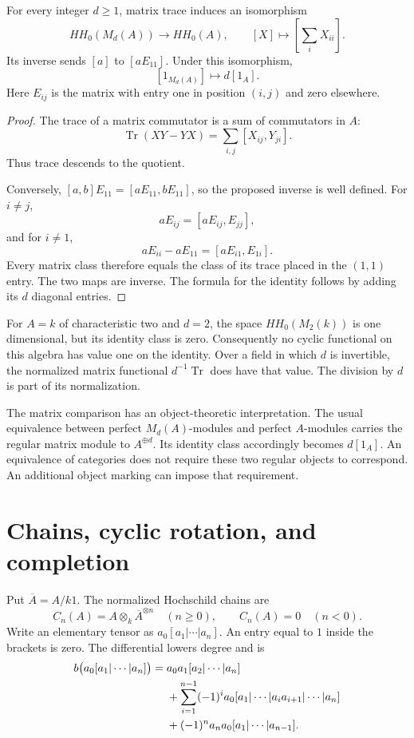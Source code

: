 \begin{proposition}
\label{v4-arith:traces:matrix-class}
For every integer $d\geq1$, matrix trace induces an isomorphism
\[
 HH_0(M_d(A))\longrightarrow HH_0(A),\qquad
 [X]\longmapsto\left[\sum_i X_{ii}\right].
\]
Its inverse sends $[a]$ to $[aE_{11}]$. Under this isomorphism,
\[
 [1_{M_d(A)}]\longmapsto d[1_A].
\]
Here $E_{ij}$ is the matrix with entry one in position $(i,j)$ and zero
elsewhere.
\end{proposition}
\begin{proof}
The trace of a matrix commutator is a sum of commutators in $A$:
\[
 \operatorname{Tr}(XY-YX)=\sum_{i,j}[X_{ij},Y_{ji}].
\]
Thus trace descends to the quotient.

Conversely, $[a,b]E_{11}=[aE_{11},bE_{11}]$, so the proposed inverse is well
defined. For $i\ne j$,
\[
 aE_{ij}=[aE_{ij},E_{jj}],
\]
and for $i\ne1$,
\[
 aE_{ii}-aE_{11}=[aE_{i1},E_{1i}].
\]
Every matrix class therefore equals the class of its trace placed in the
$(1,1)$ entry. The two maps are inverse. The formula for the identity
follows by adding its $d$ diagonal entries.
\end{proof}

For $A=k$ of characteristic two and $d=2$, the space $HH_0(M_2(k))$ is one
dimensional, but its identity class is zero. Consequently no cyclic
functional on this algebra has value one on the identity. Over a field in
which $d$ is invertible, the normalized matrix functional
$d^{-1}\operatorname{Tr}$ does have that value. The division by $d$ is part
of its normalization.

The matrix comparison has an object-theoretic interpretation. The usual
equivalence between perfect $M_d(A)$-modules and perfect $A$-modules carries
the regular matrix module to $A^{\oplus d}$. Its identity class accordingly
becomes $d[1_A]$. An equivalence of categories does not require these two
regular objects to correspond. An additional object marking can impose that
requirement.

\section{Chains, cyclic rotation, and completion}

Put $\overline A=A/k1$. The normalized Hochschild chains are
\[
 C_n(A)=A\otimes_k\overline A^{\otimes n}\quad(n\geq0),
 \qquad C_n(A)=0\quad(n<0).
\]
Write an elementary tensor as $a_0[a_1|\cdots|a_n]$. An entry equal to $1$
inside the brackets is zero. The differential lowers degree and is
\begin{align}
\label{v4-arith:traces:boundary}
 b\bigl(a_0[a_1|\cdots|a_n]\bigr)
 ={}&a_0a_1[a_2|\cdots|a_n]\\
 &+\sum_{i=1}^{n-1}(-1)^i
     a_0[a_1|\cdots|a_ia_{i+1}|\cdots|a_n]\\
 &+(-1)^na_na_0[a_1|\cdots|a_{n-1}].\notag
\end{align}

